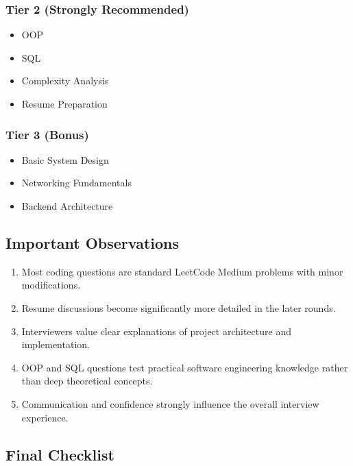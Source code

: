 \documentclass[11pt,a4paper]{article}
\begin{document}
\subsubsection{Tier 2 (Strongly Recommended)}

\begin{itemize}
	\item OOP
	\item SQL
	\item Complexity Analysis
	\item Resume Preparation
\end{itemize}

\subsubsection{Tier 3 (Bonus)}

\begin{itemize}
	\item Basic System Design
	\item Networking Fundamentals
	\item Backend Architecture
\end{itemize}


\subsection{Important Observations}

\begin{enumerate}
	\item Most coding questions are standard LeetCode Medium problems with minor modifications.
	\item Resume discussions become significantly more detailed in the later rounds.
	\item Interviewers value clear explanations of project architecture and implementation.
	\item OOP and SQL questions test practical software engineering knowledge rather than deep theoretical concepts.
	\item Communication and confidence strongly influence the overall interview experience.
\end{enumerate}


\subsection{Final Checklist}
\end{document}
